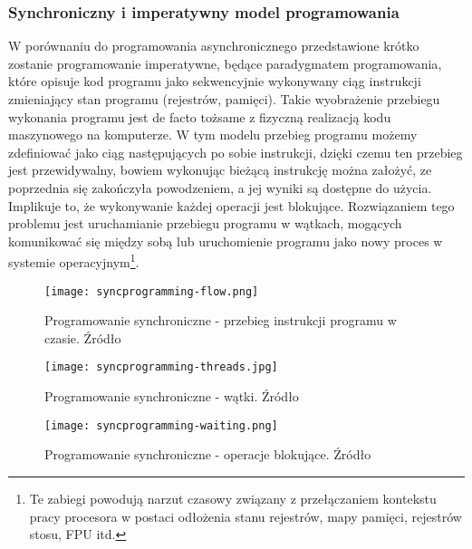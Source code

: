 \subsubsection{Synchroniczny i imperatywny model programowania}

W porównaniu do programowania asynchronicznego przedstawione krótko zostanie programowanie imperatywne, będące paradygmatem programowania\cite{programming-paradigms}, które opisuje kod programu jako sekwencyjnie wykonywany ciąg instrukcji zmieniający stan programu (rejestrów, pamięci). Takie wyobrażenie przebiegu wykonania programu jest de facto tożsame z fizyczną realizacją kodu maszynowego na komputerze. W tym modelu przebieg programu możemy zdefiniować jako ciąg następujących po sobie instrukcji, dzięki czemu ten przebieg jest przewidywalny, bowiem wykonując bieżącą instrukcję można założyć, ze poprzednia się zakończyła powodzeniem, a jej wyniki są dostępne do użycia. Implikuje to, że wykonywanie każdej operacji jest blokujące. Rozwiązaniem tego problemu jest uruchamianie przebiegu programu w wątkach, mogących komunikować się między sobą lub uruchomienie programu jako nowy proces w systemie operacyjnym\footnote{Te zabiegi powodują narzut czasowy związany z przełączaniem kontekstu pracy procesora w postaci odłożenia stanu rejestrów, mapy pamięci, rejestrów stosu, FPU itd.}.

\begin{figure}[ht]
\centering
\begin{minipage}[b]{0.45\linewidth}
  \label{fig:syncprogramming-flow}
  \centering
    \texttt{[image: syncprogramming-flow.png]}
  \caption[Programowanie synchroniczne - przebieg instrukcji programu w czasie]{Programowanie synchroniczne - przebieg instrukcji programu w czasie. Źródło \cite{programming-async}}
\end{minipage}

\begin{minipage}[b]{0.45\linewidth}
\label{fig:syncprogramming-threads}
  \centering
    \texttt{[image: syncprogramming-threads.jpg]}
  \caption[Programowanie synchroniczne - wątki]{Programowanie synchroniczne - wątki. Źródło \cite{programming-async}}
\end{minipage}

\begin{minipage}[b]{0.45\linewidth}
\label{fig:syncprogramming-waiting}
  \centering
    \texttt{[image: syncprogramming-waiting.png]}
  \caption[Programowanie synchroniczne - operacje blokujące]{Programowanie synchroniczne - operacje blokujące. Źródło \cite{programming-async}}
\end{minipage}
\end{figure}

